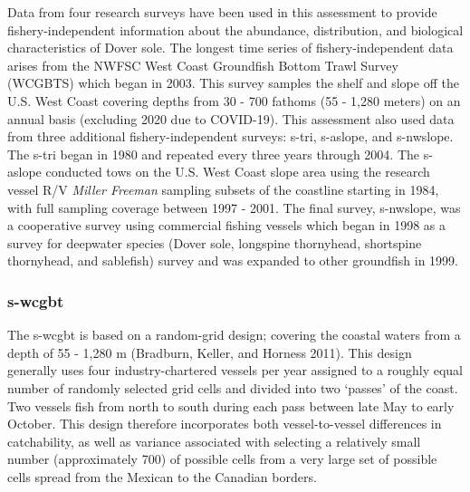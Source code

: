 \documentclass[11pt,
  english,
  a4paper,
]{article}
\begin{document}
\leavevmode\tagmcend\tagstructend


Data from four research surveys have been used in this assessment to provide fishery-independent information about the abundance, distribution, and biological characteristics of Dover sole. The longest time series of fishery-independent data arises from the NWFSC West Coast Groundfish Bottom Trawl Survey (WCGBTS) which began in 2003. This survey samples the shelf and slope off the U.S. West Coast covering depths from 30 - 700 fathoms (55 - 1,280 meters) on an annual basis (excluding 2020 due to COVID-19). This assessment also used data from three additional fishery-independent surveys: \gls{s-tri}, \gls{s-aslope}, and \gls{s-nwslope}. The \gls{s-tri} began in 1980 and repeated every three years through 2004. The \gls{s-aslope} conducted tows on the U.S. West Coast slope area using the research vessel R/V \emph{Miller Freeman} sampling subsets of the coastline starting in 1984, with full sampling coverage between 1997 - 2001. The final survey, \gls{s-nwslope}, was a cooperative survey using commercial fishing vessels which began in 1998 as a survey for deepwater species (Dover sole, longspine thornyhead, shortspine thornyhead, and sablefish) survey and was expanded to other groundfish in 1999.

\leavevmode\tagmcend\tagstructend\par


\hypertarget{nwfsc-wcgbt}{%
\subsubsection{\texorpdfstring{\acrlong{s-wcgbt}}{}}\label{nwfsc-wcgbt}}

\leavevmode\tagmcend\tagstructend


The \gls{s-wcgbt} is based on a random-grid design; covering the coastal waters from a depth of 55 - 1,280 m {(Bradburn, Keller, and Horness 2011)\leavevmode\tagmcend\tagstructend}. This design generally uses four industry-chartered vessels per year assigned to a roughly equal number of randomly selected grid cells and divided into two `passes' of the coast. Two vessels fish from north to south during each pass between late May to early October. This design therefore incorporates both vessel-to-vessel differences in catchability, as well as variance associated with selecting a relatively small number (approximately 700) of possible cells from a very large set of possible cells spread from the Mexican to the Canadian borders.
\end{document}
